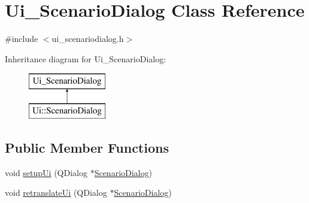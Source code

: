 \hypertarget{class_ui___scenario_dialog}{}\section{Ui\+\_\+\+Scenario\+Dialog Class Reference}
\label{class_ui___scenario_dialog}


{\ttfamily \#include $<$ui\+\_\+scenariodialog.\+h$>$}

Inheritance diagram for Ui\+\_\+\+Scenario\+Dialog\+:\begin{figure}[H]
\begin{center}
\leavevmode
\includegraphics[height=2.000000cm]{de/dfa/class_ui___scenario_dialog}
\end{center}
\end{figure}
\subsection*{Public Member Functions}
\begin{DoxyCompactItemize}
\item 
void \mbox{\hyperlink{class_ui___scenario_dialog_a8217304076a18e504845c043daeb7907}{setup\+Ui}} (Q\+Dialog $\ast$\mbox{\hyperlink{class_scenario_dialog}{Scenario\+Dialog}})
\item 
void \mbox{\hyperlink{class_ui___scenario_dialog_a9e06170f4d1c54be8730e321e8a515d2}{retranslate\+Ui}} (Q\+Dialog $\ast$\mbox{\hyperlink{class_scenario_dialog}{Scenario\+Dialog}})
\end{DoxyCompactItemize}
